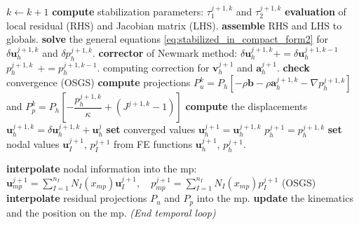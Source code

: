 \documentclass[11pt,english]{article}
\def\mp{\textit{mp}}
\begin{document}
\begin{algorithm}[h!]
\begin{algorithmic}[1]
            \State $k\leftarrow k+1$
            \State \textbf{compute} stabilization parameters: $\tau_1^{j+1,k}$ and $\tau_2^{j+1,k}$ 
            \State \textbf{evaluation} of local residual (RHS) and Jacobian matrix (LHS).
            \State \textbf{assemble} RHS and LHS to globals.
            \State \textbf{solve} the general equations \eqref{eq:stabilized_in_compact_form2} for $\delta \textbf{u}_h^{j+1,k}$ and $\delta p_h^{j+1,k}$.
            \State \textbf{corrector} of Newmark method: 
            \State \hspace{\algorithmicindent}
            $\delta \boldsymbol{u}_h^{j+1,k}+=\delta \boldsymbol{u}_h^{j+1,k-1}$
            \State \hspace{\algorithmicindent} $p_h^{j+1,k} \ \ += p_h^{j+1,k-1}$. 
            \State computing correction for $\boldsymbol{v}^{j+1}_h$ and $\boldsymbol{a}^{j+1}_h$.
            \State \textbf{check} convergence
              (OSGS)
                \State \textbf{compute} projections
                \State $P^{k}_u=P_h\left[ -\rho\boldsymbol{b}- \rho\boldsymbol{a}^{j+1,k}_h-\nabla p_h^{j+1,k}\right]$ and $P^{k}_p=P_h\left[ -\dfrac{p_h^{j+1,k}}{\kappa}+(J^{j+1,k}-1)\right]$
            \EndIf
        \EndWhile
        \State \textbf{compute} the displacements $\boldsymbol{u}_h^{j+1,k}=\delta \boldsymbol{u}_h^{j+1,k}+\boldsymbol{u}_h^{j}$
        \State \textbf{set} converged values
        \State \hspace{\algorithmicindent} $\boldsymbol{u}_h^{j+1}=\boldsymbol{u}_h^{j+1,k}$
        \State \hspace{\algorithmicindent} $p_h^{j+1}=p_h^{j+1,k}$
        \State \textbf{set} nodal values $\boldsymbol{u}_I^{j+1}$, $p_I^{j+1}$ from FE functions $\boldsymbol{u}_h^{j+1}$, $p_h^{j+1}$.
       
        \State {}
        \State \textbf{interpolate} nodal information into the mp: 
        \State \hspace{\algorithmicindent} $\boldsymbol{u}^{j+1}_{\mp} = \sum^{n_I}_{I=1} N_I(x_{\mp}) \boldsymbol{u}^{j+1}_I, \quad  p_{\mp}^{j+1}=\sum^{n_I}_{I=1} N_I(x_{\mp}) p_I^{j+1}$
         (OSGS)
        \State \textbf{interpolate} residual projections $P_u$ and $P_p$ into the mp. 
        \EndIf
        \State \textbf{update} the kinematics and the position on the mp.
    \EndFor \textit{(End temporal loop)}
    \end{algorithmic}
\end{algorithm}
\end{document}
